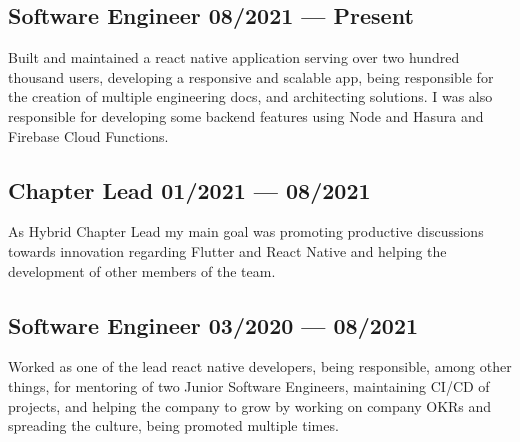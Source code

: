 \documentclass[letter,10pt]{article}
\begin{document}
\subsection{{Software Engineer \hfill 08/2021 --- Present}}
\vspace{3mm} 
Built and maintained a react native application serving over two hundred thousand users, developing a responsive and scalable app, being responsible for the creation of multiple engineering docs, and architecting solutions. I was also responsible for developing some backend features using Node and Hasura and Firebase Cloud Functions.
\vspace{1mm} 


\subsection{{Chapter Lead \hfill 01/2021 --- 08/2021}}
\vspace{3mm} 
As Hybrid Chapter Lead my main goal was promoting productive discussions towards innovation regarding Flutter and React Native and helping the development of other members of the team.
\vspace{1mm} 

\subsection{{Software Engineer \hfill 03/2020 --- 08/2021}}
\vspace{3mm} 
Worked as one of the lead react native developers, being responsible, among other things, for mentoring of two Junior Software Engineers, maintaining CI/CD of projects, and helping the company to grow by working on company OKRs and spreading the culture, being promoted multiple times.
\vspace{1mm} 
\end{document}
